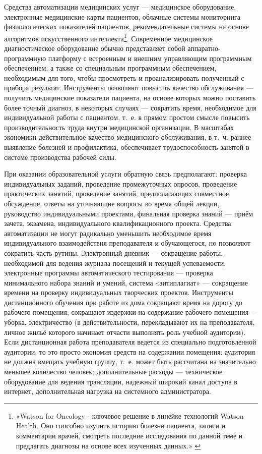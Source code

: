 \documentclass{article}
\begin{document}
Средства автоматизации медицинских услуг — медицинское оборудование, электронные медицинские карты пациентов, облачные системы мониторинга физиологических показателей пациентов, рекомендательные системы на основе алгоритмов искусственного интеллекта\footnote{«Watson for Oncology - ключевое решение в линейке технологий Watson Health. Оно способно изучить историю болезни пациента, записи и комментарии врачей, смотреть последние исследования по данной теме и предлагать диагнозы на основе всех изученных данных.» \cite{ibmWatson2022}}. Современное медицинское диагностическое оборудование обычно представляет собой аппаратно-программную платформу с встроенным и внешним управляющим программным обеспечением, а также со специальным программным обеспечением, необходимым для того, чтобы просмотреть и проанализировать полученный с прибора результат. Инструменты позволяют повысить качество обслуживания — получить медицинские показатели пациента, на основе которых можно поставить более точный диагноз, в некоторых случаях — сократить время, необходимое для индивидуальной работы с пациентом, т.~е. в прямом простом смысле повысить производительность труда внутри медицинской организации. В масштабах экономики действительное качество медицинского обслуживания, в т.~ч. раннее выявление болезней и профилактика, обеспечивает трудоспособность занятой в системе производства рабочей силы.

При оказании образовательной услуги обратную связь предполагают: проверка индивидуальных заданий, проведение промежуточных опросов, проведение практических занятий, проведение занятий, предполагающих совместное обсуждение, ответы на уточняющие вопросы во время общей лекции, руководство индивидуальными проектами, финальная проверка знаний — приём зачета, экзамена, индивидуального квалификационного проекта. Средства автоматизации не могут радикально уменьшить необходимое время индивидуального взаимодействия преподавателя и обучающегося, но позволяют сократить часть рутины. Электронный дневник — сокращение работы, необходимой для ведения журнала посещений и текущей успеваемости, электронные программы автоматического тестирования — проверка минимального набора знаний и умений, система «антиплагиат» — сокращение времени на проверку индивидуальных творческих проектов. Инструменты дистанционного обучения при работе из дома сокращают время на дорогу до рабочего помещения, сокращают издержки на содержание рабочего помещения — уборка, электричество (в действительности, перекладывают их на преподавателя, личное жильё которого начинает отчасти выполнять роль учебной аудитории). Если дистанционная работа преподавателя ведется из специально подготовленной аудитории, то это просто экономия средств на содержании помещения: аудитория не должна вмещать учебную группу, т.~е. может быть рассчитана на значительно меньшее количество человек; дополнительные расходы — техническое оборудование для ведения трансляции, надежный широкий канал доступа в интернет, дополнительная  нагрузка на системного администратора.
\end{document}
